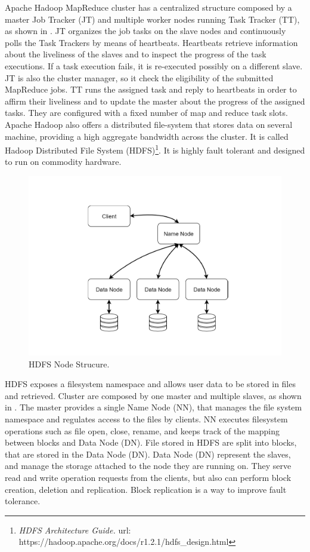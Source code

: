 Apache Hadoop MapReduce cluster has a centralized structure composed by a master Job Tracker (JT) and multiple worker nodes running Task Tracker (TT), as shown in  . JT organizes the job tasks on the slave nodes and continuously polls the Task Trackers by means of heartbeats. Heartbeats retrieve information about the liveliness of the slaves and to inspect the progress of the task  executions. If a task execution fails, it is re-executed possibly on a different slave. JT is also the cluster manager, so it check the eligibility of the submitted MapReduce jobs. TT runs the assigned task and reply to heartbeats in order to affirm their liveliness and to update the master
about the progress of the assigned tasks. They are configured with a fixed number of map and reduce task slots.
Apache Hadoop also offers a distributed file-system that stores data on several machine, 
providing a high aggregate bandwidth across the cluster. It is called Hadoop Distributed File System (HDFS)\footnote{\textit{HDFS Architecture Guide.} url:  https://hadoop.apache.org/docs/r1.2.1/hdfs\_design.html}. 
It is highly fault tolerant and designed to run on commodity hardware.
\begin{figure}
	\centering
	\includegraphics[width=\columnwidth]{Images/hdfs_1.pdf}  
	\caption[HDFS Node Strucure]{HDFS Node Strucure.}
	\label{fig:hdfsNodeStruct}
\end{figure}
HDFS exposes a filesystem namespace and allows user data to be stored in files and
retrieved. Cluster are composed by one master and multiple slaves, as shown in .
The master provides a single Name Node (NN), that manages
the file system namespace and regulates access to the files by clients.
NN executes filesystem operations such as file open, close, rename, 
and keeps track of the mapping between blocks and Data Node (DN). 
File stored in HDFS are split into blocks, that are stored in the Data Node (DN). Data Node (DN) represent the slaves, and manage the storage attached to the node they are running on. They serve read and write operation requests from the clients, but also
can perform block creation, deletion and replication. Block replication is a way to improve fault tolerance.


